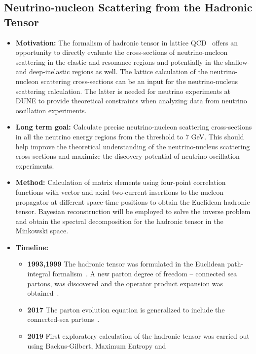 \documentclass[12pt,hyperpdf]{article}
\begin{document}
\subsection{Neutrino-nucleon Scattering from the Hadronic Tensor}
\begin{itemize}
    \item{\bf Motivation:} The formalism of hadronic tensor in lattice
      QCD~\cite{Liu:1993cv,Liu:1999ak} offers an opportunity to
      directly evaluate the cross-sections of neutrino-nucleon
      scattering in the elastic and resonance regions and potentially
      in the shallow- and deep-inelastic regions as well. The lattice
      calculation of the neutrino-nucleon scattering cross-sections
      can be an input for the neutrino-nucleus scattering
      calculation. The latter is needed for neutrino experiments at
      DUNE to provide theoretical constraints when analyzing data from
      neutrino oscillation experiments. 
    \item{\bf Long term goal:} Calculate precise neutrino-nucleon
      scattering cross-sections in all the neutrino energy regions
      from the threshold to 7 GeV. This should help improve the
      theoretical understanding of the neutrino-nucleus scattering
      cross-sections and maximize the discovery potential of neutrino
      oscillation experiments. 
    \item{\bf Method:}  Calculation of matrix elements using four-point
      correlation functions with vector and axial two-current
      insertions to the nucleon propagator at different space-time
      positions to obtain the Euclidean hadronic tensor. Bayesian
      reconstruction will be employed to solve the inverse problem and
      obtain the spectral decomposition for the hadronic tensor in the
      Minkowski space. 
    \item{\bf Timeline:}
    \begin{itemize}
    \item{\bf 1993,1999} The hadronic tensor was formulated in the
      Euclidean path-integral formalism~\cite{Liu:1993cv}. A new
      parton degree of freedom -- connected sea partons, was
      discovered and the operator product expansion was
      obtained~\cite{Liu:1999ak}. 
  \item{\bf 2017} The parton evolution equation is generalized to include
    the connected-sea partons~\cite{Liu:2017lpe}. 
    \item{\bf 2019} First exploratory calculation of the hadronic tensor
      was carried out using Backus-Gilbert, Maximum Entropy and

\end{itemize}
\end{itemize}
\end{document}
